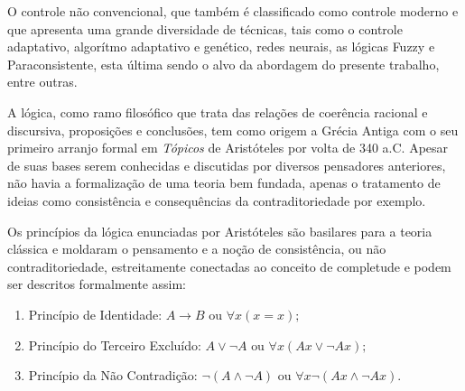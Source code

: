 O controle não convencional, 
que também é classificado como controle moderno e que
apresenta uma grande diversidade de técnicas, 
tais como o controle adaptativo, 
algorítmo adaptativo e genético, 
redes neurais, 
as lógicas Fuzzy e Paraconsistente, 
esta última sendo o alvo da abordagem do presente trabalho, 
entre outras.


A lógica, como ramo filosófico que trata das 
relações de coerência racional e discursiva, proposições e conclusões, 
tem como origem a Grécia Antiga com o seu primeiro arranjo formal em 
\emph{Tópicos} de Aristóteles por volta de 340 a.C. 
Apesar de suas bases serem conhecidas e discutidas por 
diversos pensadores anteriores, 
não havia a formalização de uma teoria bem fundada, 
apenas o tratamento de ideias como 
consistência e consequências da contraditoriedade por exemplo. 

Os princípios da lógica enunciadas por Aristóteles são 
basilares para a teoria clássica e 
moldaram o pensamento e a noção de consistência, ou não contraditoriedade, 
estreitamente conectadas ao conceito de completude e 
podem ser descritos formalmente assim:


\begin{enumerate}
\item Princípio de Identidade: 
    \begin{math}
	A \rightarrow B 
	\textrm{ ou } 
	\forall x(x=x);
    \end{math}

\item Princípio do Terceiro Excluído:
    \begin{math}
	A \vee \neg A
	\textrm{ ou }
	\forall x(Ax \vee \neg Ax);
    \end{math}

\item Princípio da Não Contradição: 
    \begin{math}
	\neg (A \wedge \neg A)
	\textrm{ ou }
	\forall x\neg(Ax \wedge \neg Ax).
    \end{math}

\end{enumerate}

